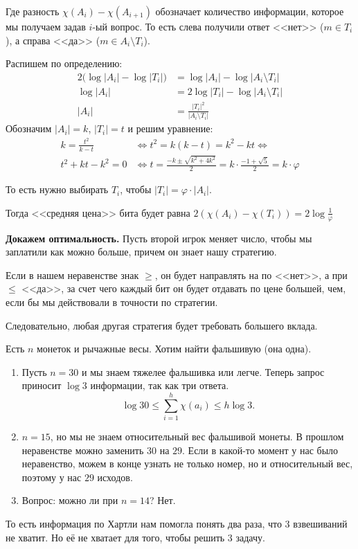 Где разность $ \chi(A_i) - \chi(A_{i + 1})$ обозначает количество информации, которое мы получаем задав $ i$-ый вопрос. То есть слева получили ответ <<нет>> ($ m \in T_i$), а справа <<да>> ($ m \in A_i \setminus T_i$).

Распишем по определению:
\begin{align*}
	2\bigl(\log \lvert A_i \rvert  - \log \lvert T_i \rvert \bigr) &= \log \lvert A_i \rvert - \log \lvert A_i \setminus T_i \rvert \\
	\log \lvert A_i \rvert &= 2 \log \lvert T_i \rvert - \log \lvert A_i \setminus T_i \rvert \\
	\lvert A_i \rvert  &= \frac{\lvert T_i \rvert^2 }{\lvert A_i \setminus T_i \rvert }
\end{align*}
Обозначим $ \lvert A_i \rvert = k$, $ \lvert T_i \rvert  = t$ и решим уравнение:
\begin{align*}
	k = \frac{t^2}{k-t} & \Longleftrightarrow t^2 = k(k-t) = k^2 -kt \Longleftrightarrow \\
	t^2 + kt - k^2 = 0 &\Longleftrightarrow t = \frac{-k \pm \sqrt{ k^2 + 4k^2} }{2} = k \cdot \frac{-1 + \sqrt{ 5}}{2}  = k \cdot \varphi 
\end{align*}

То есть нужно выбирать $ T_i$, чтобы $\lvert T_i \rvert = \varphi \cdot  \lvert A_i \rvert $. 

Тогда <<средняя цена>> бита будет равна $ 2(\chi(A_i) - \chi(T_i)) = 2 \log \frac{1}{\varphi}$

\textbf{Докажем оптимальность.} Пусть второй игрок меняет число, чтобы мы заплатили как можно больше, причем он знает нашу стратегию.

Если в нашем неравенстве знак $ \ge $, он будет направлять на по <<нет>>, а при  $ \le$ <<да>>, за счет чего каждый бит он будет отдавать по цене большей, чем, если бы мы действовали в точности по стратегии. 

Следовательно, любая другая стратегия будет требовать большего вклада.


\begin{prac}
	Есть $ n$ монеток и рычажные весы. Хотим найти фальшивую (она одна). 
\begin{enumerate}
    \item Пусть $ n = 30$ и мы знаем тяжелее фальшивка или легче. Теперь запрос приносит $  \log 3$ информации, так как три ответа.
		\[
			\log 30 \le  \sum_{i=1}^{h} \chi(a_i) \le h \log 3 
		.\] 
	\item $ n = 15$, но мы не знаем относительный вес фальшивой монеты. В прошлом неравенстве можно заменить  $ 30$ на $ 29$. Если в какой-то момент у нас было неравенство, можем в конце узнать не только номер, но и относительный вес, поэтому у нас $ 29$ исходов.
	\item Вопрос: можно ли при $ n=14$?  Нет. 
\end{enumerate} 
То есть информация по Хартли нам помогла понять два раза, что $3$ взвешиваний не хватит. Но её не хватает для того, чтобы решить $3$ задачу.
\end{prac}
